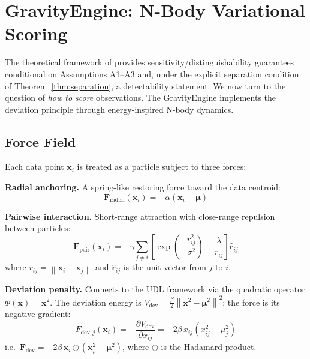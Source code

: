 \documentclass{article}
\newcommand{\norm}[1]{\left\lVert#1\right\rVert}
\begin{document}
\section{GravityEngine: N-Body Variational Scoring}
\label{sec:gravity}

The theoretical framework of  provides sensitivity/distinguishability guarantees conditional on Assumptions A1--A3 and, under the explicit separation condition of Theorem~\ref{thm:separation}, a detectability statement. We now turn to the question of \emph{how to score} observations. The GravityEngine implements the deviation principle through energy-inspired N-body dynamics.

\subsection{Force Field}

Each data point $\mathbf{x}_i$ is treated as a particle subject to three forces:

\textbf{Radial anchoring.} A spring-like restoring force toward the data centroid:
\begin{equation}
\mathbf{F}_{\text{radial}}(\mathbf{x}_i) = -\alpha(\mathbf{x}_i - \bm{\mu})
\label{eq:f_radial}
\end{equation}

\textbf{Pairwise interaction.} Short-range attraction with close-range repulsion between particles:
\begin{equation}
\mathbf{F}_{\text{pair}}(\mathbf{x}_i) = -\gamma \sum_{j \neq i} \left[\exp\!\left(-\frac{r_{ij}^2}{\sigma^2}\right) - \frac{\lambda}{r_{ij}}\right] \hat{\mathbf{r}}_{ij}
\label{eq:f_pair}
\end{equation}
where $r_{ij} = \norm{\mathbf{x}_i - \mathbf{x}_j}$ and $\hat{\mathbf{r}}_{ij}$ is the unit vector from $j$ to $i$.

\textbf{Deviation penalty.} Connects to the UDL framework via the quadratic operator $\Phi(\mathbf{x}) = \mathbf{x}^2$. The deviation energy is $V_{\text{dev}} = \frac{\beta}{2}\norm{\mathbf{x}^2 - \bm{\mu}^2}^2$; the force is its negative gradient:
\begin{equation}
F_{\text{dev},j}(\mathbf{x}_i) = -\frac{\partial V_{\text{dev}}}{\partial x_{ij}} = -2\beta\, x_{ij}(x_{ij}^2 - \mu_j^2)
\label{eq:f_dev}
\end{equation}
i.e.\ $\mathbf{F}_{\text{dev}} = -2\beta\,\mathbf{x}_i \odot (\mathbf{x}_i^2 - \bm{\mu}^2)$, where $\odot$ is the Hadamard product.
\end{document}
